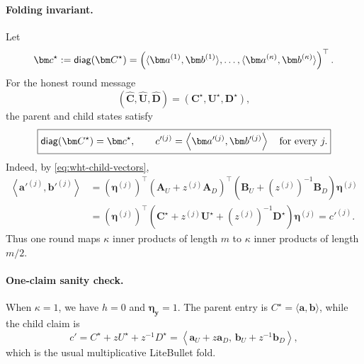 \documentclass[runningheads]{llncs}
\begin{document}
\paragraph{Folding invariant.}
Let
\[
    \bm c^\star:=
      \diag(\bm C^\star)
      =
      \left(
        \langle\bm a^{(1)},\bm b^{(1)}\rangle,
        \ldots,
        \langle\bm a^{(\kappa)},\bm b^{(\kappa)}\rangle
      \right)^\top.
\]
For the honest round message
\[
    (\widehat{\bm C},\widehat{\bm U},\widehat{\bm D})
      =
    (\bm C^\star,\bm U^\star,\bm D^\star),
\]
the parent and child states satisfy
\begin{equation}
    \boxed{
    \diag(\bm C^\star)=\bm c^\star,
    \qquad
    c'^{(j)}
      =
      \left\langle\bm a'^{(j)},\bm b'^{(j)}\right\rangle
      \quad\text{for every }j.
    }
\label{eq:wht-folding-invariant}
\end{equation}
Indeed, by \eqref{eq:wht-child-vectors},
\[
\begin{aligned}
    \left\langle\bm a'^{(j)},\bm b'^{(j)}\right\rangle
      &=
      (\bm\eta^{(j)})^\top
      \left(\bm A_U+z^{(j)}\bm A_D\right)^\top
      \left(\bm B_U+(z^{(j)})^{-1}\bm B_D\right)
      \bm\eta^{(j)}\\
      &=
      (\bm\eta^{(j)})^\top
      \left(
        \bm C^\star
        +z^{(j)}\bm U^\star
        +(z^{(j)})^{-1}\bm D^\star
      \right)
      \bm\eta^{(j)}
      =c'^{(j)}.
\end{aligned}
\]
Thus one round maps \(\kappa\) inner products of length \(m\) to
\(\kappa\) inner products of length \(m/2\).

\paragraph{One-claim sanity check.}
When \(\kappa=1\), we have \(h=0\) and
\(\bm\eta_{\bm y}=1\).  The parent entry is
\(C^\star=\langle\bm a,\bm b\rangle\), while the child claim is
\[
    c'=C^\star+zU^\star+z^{-1}D^\star
      =
      \left\langle
        \bm a_U+z\bm a_D,\,
        \bm b_U+z^{-1}\bm b_D
      \right\rangle,
\]
which is the usual multiplicative LiteBullet fold.
\end{document}
